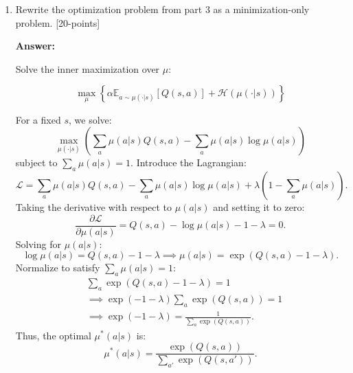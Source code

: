 \documentclass[12pt]{article}
\begin{document}
{{\begin{enumerate}
\textbf{Answer:}

\begin{enumerate}
\item $\alpha \mathbb{E}_{s \sim D, a \sim \mu} [Q(s,a)]$: Penalizes OOD actions by maximizing $Q$ under adversarially chosen $\mu$ to identify overestimated actions.

\item $-\alpha \mathbb{E}_{(s,a) \sim D} [Q(s,a)]$: Preserves dataset values by minimizing $Q$ on in-distribution $(s,a)$ pairs.

\item $-\mathbb{E}_s [\mathcal{H}(\mu)]$: Regularizes $\mu$ by encouraging high entropy to prevent adversarial collapse to a single action.

\item Bellman error term: Enforces consistency with the Bellman equation on dataset transitions.
\end{enumerate}

\item  Rewrite the optimization problem from part 3 as a minimization-only problem. [20-points]

\textbf{Answer:}

Solve the inner maximization over $\mu$:

\[
\max_{\mu} \left\{ \alpha \mathbb{E}_{a \sim \mu(\cdot|s)}[Q(s,a)] + \mathcal{H}(\mu(\cdot|s)) \right\}
\]

For a fixed $s$, we solve:
$$
\max_{\mu(\cdot|s)} \left( \sum_a \mu(a|s) Q(s, a) - \sum_a \mu(a|s) \log \mu(a|s) \right)
$$
subject to $\sum_a \mu(a|s) = 1$. Introduce the Lagrangian:
$$
\mathcal{L} = \sum_a \mu(a|s) Q(s, a) - \sum_a \mu(a|s) \log \mu(a|s) + \lambda \left(1 - \sum_a \mu(a|s)\right).
$$
Taking the derivative with respect to $\mu(a|s)$ and setting it to zero:
$$
\frac{\partial \mathcal{L}}{\partial \mu(a|s)} = Q(s, a) - \log \mu(a|s) - 1 - \lambda = 0.
$$
Solving for $\mu(a|s)$:
$$
\log \mu(a|s) = Q(s, a) - 1 - \lambda \implies \mu(a|s) = \exp(Q(s, a) - 1 - \lambda).
$$
Normalize to satisfy $\sum_a \mu(a|s) = 1$:
\begin{align*}
&\sum_a \exp(Q(s, a) - 1 - \lambda) = 1 \\
&\implies \exp(-1 - \lambda) \sum_a \exp(Q(s, a)) = 1 \\
&\implies \exp(-1 - \lambda) = \frac{1}{\sum_a \exp(Q(s, a))}.
\end{align*}
Thus, the optimal $\mu^*(a|s)$ is:
$$
\mu^*(a|s) = \frac{\exp(Q(s, a))}{\sum_{a'} \exp(Q(s, a'))}.
$$


\end{enumerate}}}
\end{document}
